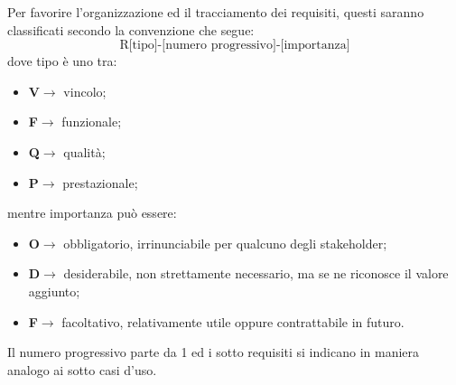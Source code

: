                 Per favorire l'organizzazione ed il tracciamento dei requisiti, questi saranno classificati secondo la convenzione che segue:
                $$\text{R[tipo]-[numero progressivo]-[importanza]}$$
                dove tipo è uno tra:
                \begin{itemize}
                    \item \textbf{V}$\rightarrow$ vincolo;
                    \item \textbf{F}$\rightarrow$ funzionale;
                    \item \textbf{Q}$\rightarrow$ qualità;
                    \item \textbf{P}$\rightarrow$ prestazionale;
                \end{itemize}
                mentre importanza può essere:
                \begin{itemize}
                    \item \textbf{O}$\rightarrow$ obbligatorio, irrinunciabile per qualcuno degli stakeholder;
                    \item \textbf{D}$\rightarrow$ desiderabile, non strettamente necessario, ma se ne riconosce il valore aggiunto;
                    \item \textbf{F}$\rightarrow$ facoltativo, relativamente utile oppure contrattabile in futuro.
                \end{itemize}
                Il numero progressivo parte da 1 ed i sotto requisiti si indicano in maniera analogo ai sotto casi d'uso.

